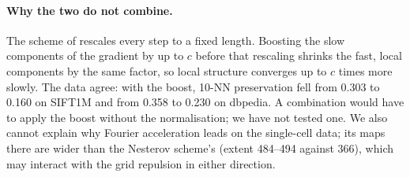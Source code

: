 \documentclass[11pt]{article}
\begin{document}
\paragraph{Why the two do not combine.} The scheme of \citet{lambert2023nesterov} rescales every step to a fixed
length. Boosting the slow components of the gradient by up to $c$ before that rescaling shrinks the fast, local
components by the same factor, so local structure converges up to $c$ times more slowly. The data agree: with the
boost, 10-NN preservation fell from 0.303 to 0.160 on SIFT1M and from 0.358 to 0.230 on dbpedia. A combination would
have to apply the boost without the normalisation; we have not tested one. We also cannot explain why Fourier
acceleration leads on the single-cell data; its maps there are wider than the Nesterov scheme's (extent 484--494
against 366), which may interact with the grid repulsion in either direction.
\end{document}
